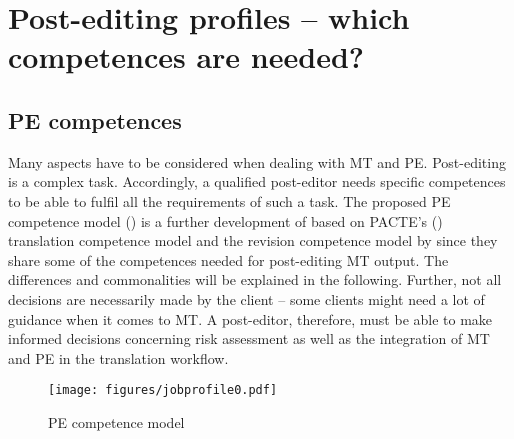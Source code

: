 \chapter{Post-editing profiles -- which competences are needed?}\label{sec:9}



\section{PE competences}\label{sec:9:1}

Many aspects have to be considered when dealing with MT and PE. Post-editing is a complex task. Accordingly, a qualified post-editor needs specific competences to be able to fulfil all the requirements of such a task. The proposed PE competence model () is a further development of \citet{nitzke2019risk} based on PACTE’s (\citeyear{beeby2003building}) translation competence model and the revision competence model by \citet{robert2017towards} since they share some of the competences needed for post-editing MT output. The differences and commonalities will be explained in the following. Further, not all decisions are necessarily made by the client – some clients might need a lot of guidance when it comes to MT. A post-editor, therefore, must be able to make informed decisions concerning risk assessment as well as the integration of MT and PE in the translation workflow.

\begin{figure} 
\texttt{[image: figures/jobprofile0.pdf]}
\caption{PE competence model}
\label{fig:key:9:1}
\end{figure}


